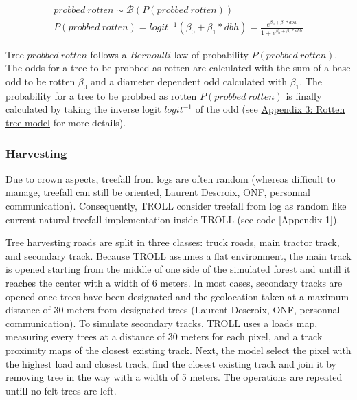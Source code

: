 \documentclass[12pt,]{article}
\theoremstyle{definition}
\theoremstyle{definition}
\theoremstyle{remark}
\begin{document}
\begin{equation}
  \begin{array}{c} 
    probbed~rotten \sim \mathcal{B}(P(probbed~rotten)) \\
    P(probbed~rotten) = logit^{-1}(\beta_0 + \beta_1*dbh) = \frac{e^{\beta_0 + \beta_1*dbh}}{1 + e^{\beta_0 + \beta_1*dbh}}
  \end{array}
  \label{eq:rotten}
\end{equation}

Tree \(probbed~rotten\) follows a \(Bernoulli\) law of probability
\(P(probbed~rotten)\). The odds for a tree to be probbed as rotten are
calculated with the sum of a base odd to be rotten \(\beta_0\) and a
diameter dependent odd calculated with \(\beta_1\). The probability for
a tree to be probbed as rotten \(P(probbed~rotten)\) is finally
calculated by taking the inverse logit \(logit^{-1}\) of the odd (see
\protect\hyperlink{appendix-3-rotten-tree-model}{Appendix 3: Rotten tree
model} for more details).

\subsubsection{Harvesting}\label{harvesting}

Due to crown aspects, treefall from logs are often random (whereas
difficult to manage, treefall can still be oriented, Laurent Descroix,
ONF, personnal communication). Consequently, TROLL consider treefall
from log as random like current natural treefall implementation inside
TROLL (see code {[}Appendix 1{]}).

Tree harvesting roads are split in three classes: truck roads, main
tractor track, and secondary track. Because TROLL assumes a flat
environment, the main track is opened starting from the middle of one
side of the simulated forest and untill it reaches the center with a
width of 6 meters. In most cases, secondary tracks are opened once trees
have been designated and the geolocation taken at a maximum distance of
30 meters from designated trees (Laurent Descroix, ONF, personnal
communication). To simulate secondary tracks, TROLL uses a loads map,
measuring every trees at a distance of 30 meters for each pixel, and a
track proximity maps of the closest existing track. Next, the model
select the pixel with the highest load and closest track, find the
closest existing track and join it by removing tree in the way with a
width of 5 meters. The operations are repeated untill no felt trees are
left.
\end{document}
